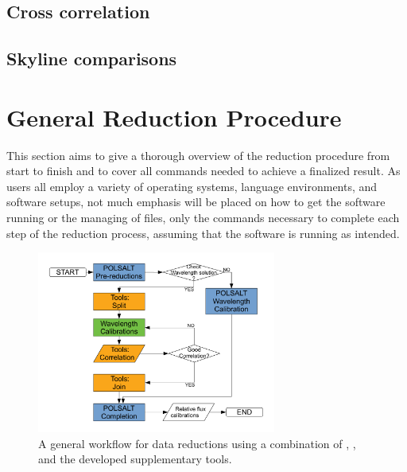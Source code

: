 \subsection{Cross correlation}



\subsection{Skyline comparisons}



\section{General Reduction Procedure}\label{sec:red_proc}

This section aims to give a thorough overview of the reduction procedure from start to finish and to cover all commands needed to achieve a finalized result. As users all employ a variety of operating systems, language environments, and software setups, not much emphasis will be placed on how to get the software running or the managing of files, only the commands necessary to complete each step of the reduction process, assuming that the software is running as intended.
\prgph

\prgph

\begin{figure}[t]
    \centering
    \includegraphics[width = 0.7\textwidth]{figures/3_new_workflow.pdf}
    \caption{A general workflow for data reductions using a combination of \polsalt, \iraf, and the developed supplementary tools.}
    \label{fig:new_workflow}
\end{figure}


